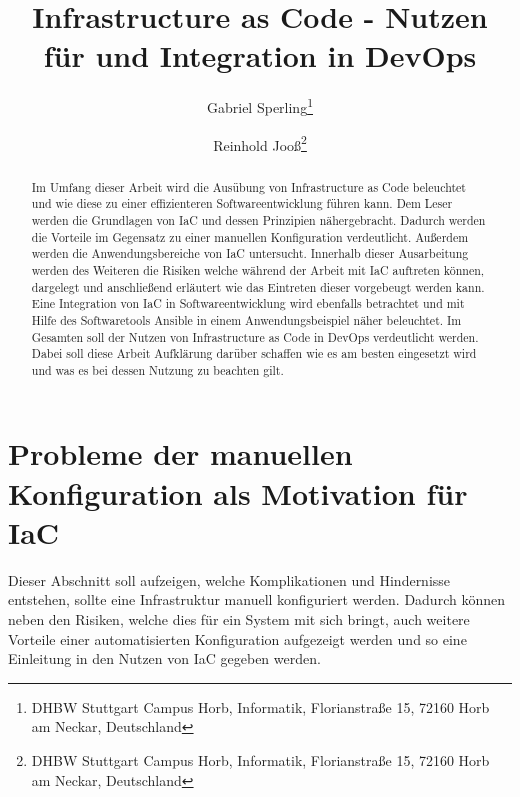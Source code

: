 \documentclass[biblatex]{lni}
\begin{document}

\title[Infrastructure as Code]{Infrastructure as Code - Nutzen für und Integration in DevOps}
\author[Gabriel Sperling \and Reinhold Jooß]
{Gabriel Sperling\footnote{DHBW Stuttgart Campus Horb, Informatik, Florianstraße 15, 72160 Horb am Neckar, Deutschland } \and
Reinhold Jooß\footnote{DHBW Stuttgart Campus Horb, Informatik, Florianstraße 15, 72160 Horb am Neckar, Deutschland
}}
\maketitle

\begin{abstract}
Im Umfang dieser Arbeit wird die Ausübung von Infrastructure as Code beleuchtet und wie diese zu einer effizienteren Softwareentwicklung führen kann. Dem Leser werden die Grundlagen von IaC und dessen Prinzipien nähergebracht. Dadurch werden die Vorteile im Gegensatz zu einer manuellen Konfiguration verdeutlicht. Außerdem werden die Anwendungsbereiche von IaC untersucht. Innerhalb dieser Ausarbeitung werden des Weiteren die Risiken welche während der Arbeit mit IaC auftreten können, dargelegt und anschließend erläutert wie das Eintreten dieser vorgebeugt werden kann. Eine Integration von IaC in Softwareentwicklung wird ebenfalls betrachtet und mit Hilfe des Softwaretools Ansible in einem Anwendungsbeispiel näher beleuchtet. Im Gesamten soll der Nutzen von Infrastructure as Code in DevOps verdeutlicht werden. Dabei soll diese Arbeit Aufklärung darüber schaffen wie es am besten eingesetzt wird und was es bei dessen Nutzung zu beachten gilt.
\end{abstract}
\section{Probleme der manuellen Konfiguration als Motivation für IaC} %
Dieser Abschnitt soll aufzeigen, welche Komplikationen und Hindernisse entstehen, sollte eine Infrastruktur manuell konfiguriert werden. Dadurch können neben den Risiken, welche dies für ein System mit sich bringt, auch weitere Vorteile einer automatisierten Konfiguration aufgezeigt werden und so eine Einleitung in den Nutzen von IaC gegeben werden. 
\end{document}
